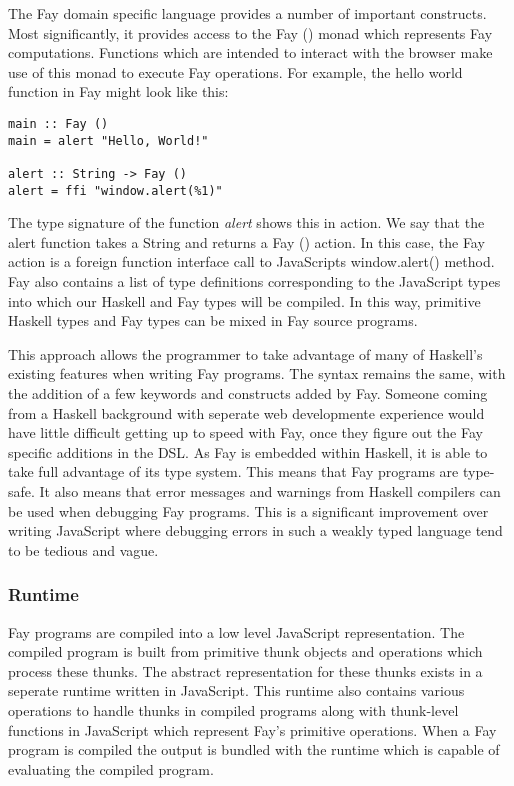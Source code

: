 The Fay domain specific language provides a number of important 
constructs. Most significantly, it provides access to the Fay () monad
which represents Fay computations. Functions which are intended to interact
with the browser make use of this monad to execute Fay operations. For
example, the hello world function in Fay might look like this:

\begin{verbatim}
main :: Fay ()
main = alert "Hello, World!"

alert :: String -> Fay ()
alert = ffi "window.alert(%1)"
\end{verbatim}

The type signature of the function \emph{alert} shows this in action.
We say that the alert function takes a String and returns a Fay () action.
In this case, the Fay action is a foreign function interface call to
JavaScripts window.alert() method.  Fay also contains a list of type 
definitions corresponding to the JavaScript types into which our Haskell
and Fay types will be compiled. In this way, primitive Haskell types and 
Fay types can be mixed in Fay source programs. 

This approach allows the programmer to take advantage of many of Haskell's
existing features when writing Fay programs. The syntax remains the same,
with the addition of a few keywords and constructs added by Fay. Someone
coming from a Haskell background with seperate web developmente experience
would have little difficult getting up to speed with Fay, once they figure
out the Fay specific additions in the DSL. As Fay is embedded within Haskell,
it is able to take full advantage of its type system. This means that Fay
programs are type-safe. It also means that error messages and warnings from 
Haskell compilers can be used when debugging Fay programs. This is a significant
improvement over writing JavaScript where debugging errors in such a weakly
typed language tend to be tedious and vague. 

\subsubsection{Runtime}
Fay programs are compiled into a low level JavaScript representation. The
compiled program is built from primitive thunk objects and operations
which process these thunks. The abstract representation for these thunks 
exists in a seperate runtime written in JavaScript. This runtime also contains
various operations to handle thunks in compiled programs along with thunk-level 
functions in JavaScript which represent Fay's primitive operations. When a
Fay program is compiled the output is bundled with the runtime which is 
capable of evaluating the compiled program. 

